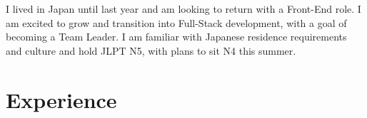 \documentclass[11pt,a4paper,sans]{moderncv} %
\begin{document}





\makecvtitle %

I lived in Japan until last year and am looking to return with a Front-End role. I am excited to grow and transition into Full-Stack development, with a goal of becoming a Team Leader. I am familiar with Japanese residence requirements and culture and hold JLPT N5, with plans to sit N4 this summer.

\section{Experience}
\end{document}
